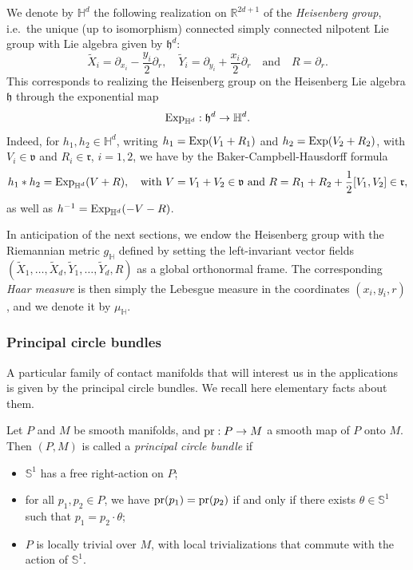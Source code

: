\documentclass[12pt,a4paper]{amsart}
\theoremstyle{plain}
\theoremstyle{definition}
\theoremstyle{remark}
\numberwithin{equation}{section}
\theoremstyle{definition}
\def\R{{\mathbb R}}%
\def \Exp{{\rm Exp}}
\def \bS{\mathbb{S}^{1}}
\def \pr{{\rm pr}}
\def \Heis{\mathbb{H}}
\def \fh{\mathfrak{h}}
\def \fv{\mathfrak{v}}
\def \fr{\mathfrak{r}}
\numberwithin{equation}{section}
\begin{document}
We denote by $\Heis^d$ the following realization on $\R^{2d+1}$ of the \emph{Heisenberg group}, i.e.~the unique (up to isomorphism) connected simply connected nilpotent Lie group
with Lie algebra given by $\fh^d$:
\begin{equation}
 \label{eq:vectorfields}
 \tilde{X}_i = \partial_{x_i} - \frac{y_i}{2} \partial_r,\quad \tilde{Y}_i = \partial_{y_i} + \frac{x_i}{2}\partial_r\quad\mbox{and}\quad R =\partial_r.
\end{equation}
This corresponds to realizing the Heisenberg group on the Heisenberg Lie algebra $\fh$ through the exponential map 
\begin{equation*}
 \Exp_{\Heis^d} : \fh^d \rightarrow \Heis^d.
\end{equation*}
Indeed, for $h_1,h_2 \in \Heis^d$, writing $h_1 = \Exp(V_1 + R_1)$ and $h_2 = \Exp(V_2 + R_2)$, with $V_i\in\fv$ and $R_i\in\fr$, $i=1,2$, we have by the Baker-Campbell-Hausdorff formula
\begin{equation*}
 h_1 * h_2 = \Exp_{\Heis^d}(V + R),\quad\mbox{with}\ V = V_1 + V_2\in\fv\ \mbox{and}\ R = R_1 + R_2 + \frac{1}{2}[V_1,V_2]\in\fr,
\end{equation*}
as well as $h^{-1} = \Exp_{\Heis^d}(-V-R)$. 

In anticipation of the next sections, we endow the Heisenberg group with the Riemannian metric $g_\Heis$ defined by setting the left-invariant vector fields $(\tilde{X}_1,\dots,\tilde{X}_d,\tilde{Y}_1,\dots,\tilde{Y}_d,R)$ as a global orthonormal
frame. The corresponding \emph{Haar measure} is then simply the Lebesgue measure in the coordinates $(x_i,y_i,r)$, and we denote it by $\mu_\Heis$.

\subsubsection{Principal circle bundles}
\label{subsubsect:princcirclebundles}

A particular family of contact manifolds that will interest us in the applications is given by the principal circle bundles. We recall here elementary facts about them.

Let $P$ and $M$ be smooth manifolds, and $\pr: P\rightarrow M$ a smooth map of $P$ onto $M$. Then $(P,M)$ is called a \emph{principal circle bundle} if
\begin{itemize}
    \item[(i)] $\bS$ has a free right-action on $P$;
    \item[(ii)] for all $p_1,p_2\in P$, we have $\pr(p_1) = \pr(p_2)$ if and only if there exists $\theta \in \bS$ such that $p_1 = p_2 \cdot \theta$;
    \item[(iii)] $P$ is locally trivial over $M$, with local trivializations that commute with the action of $\bS$.
\end{itemize}
\end{document}
